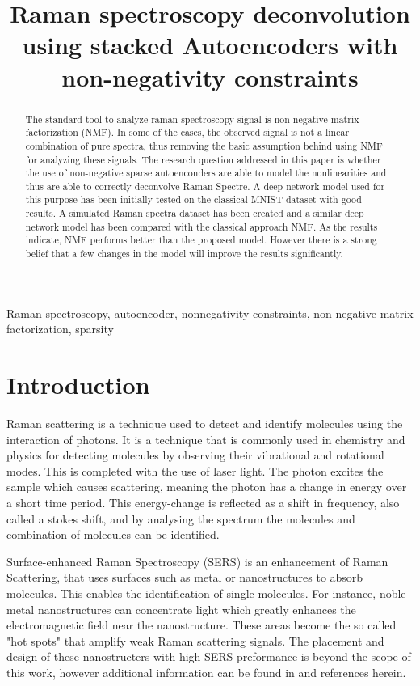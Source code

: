 \documentclass{article}
\title{Raman spectroscopy deconvolution using stacked Autoencoders with non-negativity constraints}
\begin{document}
%

\maketitle
%
\begin{abstract}
The standard tool to analyze raman spectroscopy signal is non-negative matrix factorization (NMF). In some of the cases, the observed signal is not a linear combination of pure spectra, thus removing the basic assumption behind using NMF for analyzing these signals. The research question addressed in this paper is whether the use of non-negative sparse autoenconders are able to model the nonlinearities and thus are able to correctly deconvolve Raman Spectre. A deep network model used for this purpose has been initially tested on the classical MNIST dataset with good results. A simulated Raman spectra dataset has been created and a similar deep network model has been compared with the classical approach NMF. As the results indicate, NMF performs better than the proposed model. However there is a strong belief that a few changes in the model will improve the results significantly.
\end{abstract}
%
\begin{keywords}
Raman spectroscopy, autoencoder, nonnegativity constraints, non-negative matrix factorization, sparsity
\end{keywords}
%
\section{Introduction}
\label{sec:intro}

Raman scattering is a technique used to detect and identify molecules using the interaction of photons. It is a technique that is commonly used in chemistry and physics for detecting molecules by observing their vibrational and rotational modes. This is completed with the use of laser light. The photon excites the sample which causes scattering, meaning the photon has a change in energy over a short time period. This energy-change is reflected as a shift in frequency, also called a stokes shift, and by analysing the spectrum the molecules and combination of molecules can be identified. 

Surface-enhanced Raman Spectroscopy (SERS) is an enhancement of Raman Scattering, that uses surfaces such as metal or nanostructures to absorb molecules. This enables the identification of single molecules.  For instance, noble metal nanostructures can concentrate light which greatly enhances the electromagnetic field near the nanostructure. These areas become the so called "hot spots" that amplify weak Raman scattering signals. The placement and design of these nanostructers with high SERS preformance is beyond the scope of this work, however additional information can be found in \cite{Wei2013} and references herein.
\end{document}
